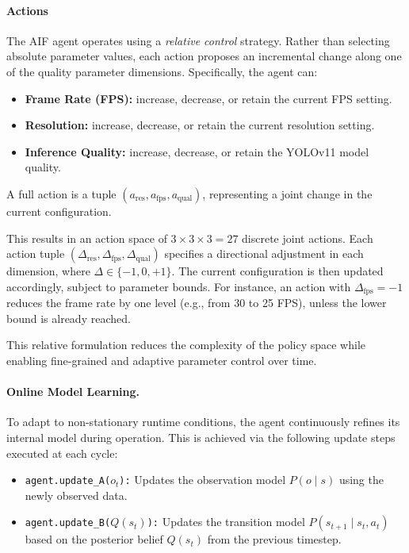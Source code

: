 \paragraph{Actions}
The AIF agent operates using a \textit{relative control} strategy. Rather than selecting absolute parameter values, each action proposes an incremental change along one of the quality parameter dimensions. Specifically, the agent can:

\begin{itemize}
  \item \textbf{Frame Rate (FPS):} increase, decrease, or retain the current FPS setting.
  \item \textbf{Resolution:} increase, decrease, or retain the current resolution setting.
  \item \textbf{Inference Quality:} increase, decrease, or retain the YOLOv11 model quality.
\end{itemize}

A full action is a tuple $(a_\text{res}, a_\text{fps}, a_\text{qual})$, representing a joint change in the current configuration.


This results in an action space of $3 \times 3 \times 3 = 27$ discrete joint actions. Each action tuple $(\Delta_\text{res}, \Delta_\text{fps}, \Delta_\text{qual})$ specifies a directional adjustment in each dimension, where \(\Delta \in \{-1, 0, +1\}\). The current configuration is then updated accordingly, subject to parameter bounds. For instance, an action with \(\Delta_\text{fps} = -1\) reduces the frame rate by one level (e.g., from 30 to 25 FPS), unless the lower bound is already reached.

This relative formulation reduces the complexity of the policy space while enabling fine-grained and adaptive parameter control over time.

\paragraph{Online Model Learning.}
To adapt to non-stationary runtime conditions, the agent continuously refines its internal model during operation. This is achieved via the following update steps executed at each cycle:

\begin{itemize}
  \item \texttt{agent.update\_A(\(o_t\)):} Updates the observation model \( P(o \mid s) \) using the newly observed data.
  \item \texttt{agent.update\_B(\(Q(s_t)\)):} Updates the transition model \( P(s_{t+1} \mid s_t, a_t) \) based on the posterior belief \(Q(s_{t})\) from the previous timestep.
\end{itemize}

